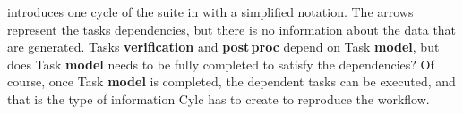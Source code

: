 \documentclass[a4paper]{article}
\begin{document}
 introduces one cycle of the suite in  with a simplified notation. The arrows represent the tasks dependencies, but there is no information about the data that are generated. Tasks \textbf{verification} and \textbf{post\,proc} depend on Task \textbf{model}, but does Task \textbf{model} needs to be fully completed to satisfy the dependencies?
Of course, once Task \textbf{model} is completed, the dependent tasks can be executed, and that is the type of information Cylc has to create to reproduce the workflow.

\end{document}
